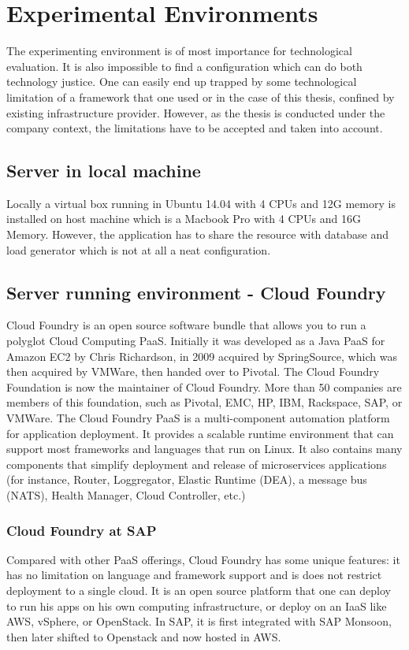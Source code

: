 \chapter{Experimental Environments}

The experimenting environment is of most importance for technological evaluation. It is also impossible to find a configuration which can do both technology justice. One can easily end up trapped by some technological limitation of a framework that one used or in the case of this thesis, confined by existing infrastructure provider. However, as the thesis is conducted under the company context, the limitations have to be accepted and taken into account. 

\section{Server in local machine}
Locally a virtual box running in Ubuntu 14.04 with 4 CPUs and 12G memory is installed on host machine which is a Macbook  Pro with 4 CPUs and 16G Memory. However, the application has to share the resource with database and load generator which is not at all a neat configuration. 

\section{Server running environment -  Cloud Foundry}
Cloud Foundry is an open source software bundle that allows you to run a polyglot Cloud Computing \ac{PaaS}. Initially it was developed as a Java \ac{PaaS} for Amazon EC2 by Chris Richardson, in 2009 acquired by SpringSource, which was then acquired by VMWare, then handed over to Pivotal.
The Cloud Foundry Foundation  \citep{Pivotal}  is now the maintainer of Cloud Foundry. More than 50 companies are members of this foundation, such as Pivotal, EMC, HP, IBM, Rackspace, SAP, or VMWare.
The Cloud Foundry PaaS is a multi-component automation platform for application deployment. It provides a scalable runtime environment that can support most frameworks and languages that run on Linux. It also contains many components that simplify deployment and release of microservices applications (for instance, Router, Loggregator, Elastic Runtime (\ac{DEA}), a message bus (NATS), Health Manager, Cloud Controller, etc.)

\subsection{Cloud Foundry at SAP}
Compared with other PaaS offerings, Cloud Foundry has some unique features: it has no limitation on language and framework support and is does not restrict deployment to a single cloud.  It is an open source platform that one can deploy to run his apps on his own computing infrastructure, or deploy on an IaaS like \ac{AWS}, vSphere, or OpenStack. In SAP, it is first integrated with SAP Monsoon, then later shifted to Openstack and now hosted in \ac{AWS}. 

